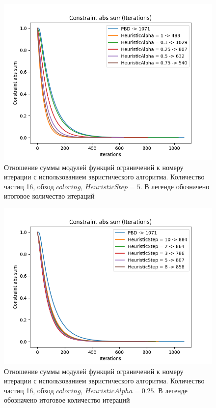 	\begin{figure}[ht!] 
		\center
		\includegraphics [scale=0.95] {my_folder/images//heuristicPlotAlpha.png}
		\caption{Отношение суммы модулей функций ограничений к номеру итерации с использованием эвристического алгоритма. Количество частиц 16, обход $coloring$, $HeuristicStep=5$. В легенде обозначено итоговое количество итераций}
		\label{fig:heuristicPlotAlpha}  
	\end{figure}
	\FloatBarrier
	
	\begin{figure}[ht!] 
		\center
		\includegraphics [scale=0.95] {my_folder/images//heuristicPlotStep.png}
		\caption{Отношение суммы модулей функций ограничений к номеру итерации с использованием эвристического алгоритма. Количество частиц 16, обход $coloring$, $HeuristicAlpha=0.25$. В легенде обозначено итоговое количество итераций}
		\label{fig:heuristicPlotStep}  
	\end{figure}	
	\FloatBarrier
	
